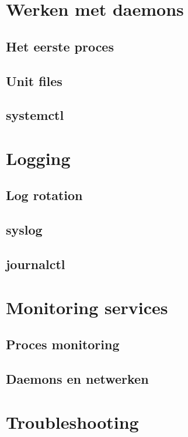 \documentclass[a4paper,12pt,twoside,openright,titlepage]{book}
\begin{document}
\chapter{Werken met daemons}

\section{Het eerste proces}

\section{Unit files}

\section{systemctl}


\chapter{Logging}

\section{Log rotation}\label{sec:logrotate}

\section{syslog}\label{sec:syslog}


\section{journalctl}\label{sec:journalctl}


\chapter{Monitoring services}

\section{Proces monitoring}

\section{Daemons en netwerken}


\chapter{Troubleshooting}


\printindex
\end{document}
